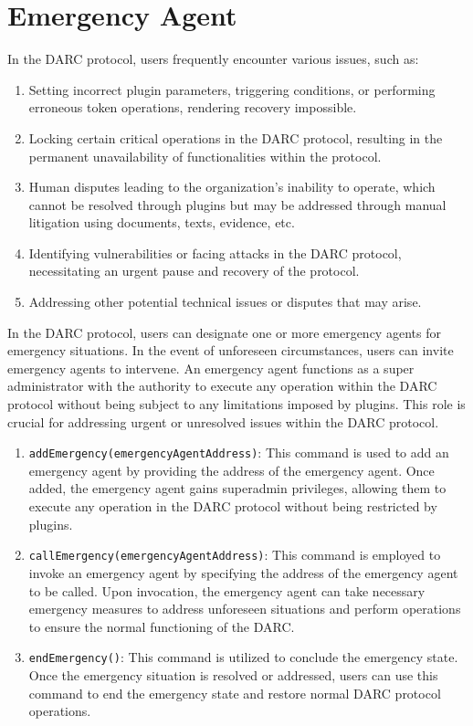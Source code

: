 \documentclass[main.tex]{subfiles}
\begin{document}
\section{Emergency Agent}

In the DARC protocol, users frequently encounter various issues, such as:

\begin{enumerate}
    \item Setting incorrect plugin parameters, triggering conditions, or performing erroneous token operations, rendering recovery impossible.
    \item Locking certain critical operations in the DARC protocol, resulting in the permanent unavailability of functionalities within the protocol.
    \item Human disputes leading to the organization's inability to operate, which cannot be resolved through plugins but may be addressed through manual litigation using documents, texts, evidence, etc.
    \item Identifying vulnerabilities or facing attacks in the DARC protocol, necessitating an urgent pause and recovery of the protocol.
    \item Addressing other potential technical issues or disputes that may arise.
\end{enumerate}

In the DARC protocol, users can designate one or more emergency agents for emergency situations. In the event of unforeseen circumstances, users can invite emergency agents to intervene. An emergency agent functions as a super administrator with the authority to execute any operation within the DARC protocol without being subject to any limitations imposed by plugins. This role is crucial for addressing urgent or unresolved issues within the DARC protocol.

\begin{enumerate}
    \item \texttt{addEmergency(emergencyAgentAddress)}: This command is used to add an emergency agent by providing the address of the emergency agent. Once added, the emergency agent gains superadmin privileges, allowing them to execute any operation in the DARC protocol without being restricted by plugins.

    \item \texttt{callEmergency(emergencyAgentAddress)}: This command is employed to invoke an emergency agent by specifying the address of the emergency agent to be called. Upon invocation, the emergency agent can take necessary emergency measures to address unforeseen situations and perform operations to ensure the normal functioning of the DARC.

    \item \texttt{endEmergency()}: This command is utilized to conclude the emergency state. Once the emergency situation is resolved or addressed, users can use this command to end the emergency state and restore normal DARC protocol operations.
\end{enumerate}
\end{document}
